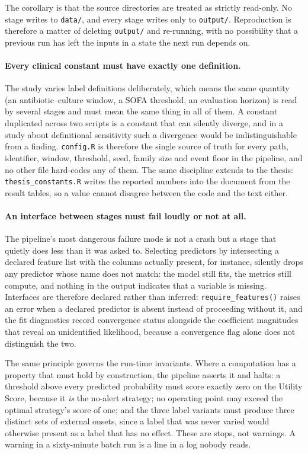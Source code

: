 The corollary is that the source directories are treated as strictly read-only.
No stage writes to \texttt{data/}, and every stage writes only to
\texttt{output/}. Reproduction is therefore a matter of deleting
\texttt{output/} and re-running, with no possibility that a previous run has
left the inputs in a state the next run depends on.

\paragraph{Every clinical constant must have exactly one definition.}
The study varies label definitions deliberately, which means the same quantity (an antibiotic--culture window, a SOFA threshold, an evaluation horizon)
is read by several stages and must mean the same thing in all of them. A
constant duplicated across two scripts is a constant that can silently diverge,
and in a study about definitional sensitivity such a divergence would be
indistinguishable from a finding. \texttt{config.R} is therefore the single
source of truth for every path, identifier, window, threshold, seed, family size
and event floor in the pipeline, and no other file hard-codes any of them. The
same discipline extends to the thesis: \texttt{thesis\_constants.R} writes the
reported numbers into the document from the result tables, so a value cannot
disagree between the code and the text either.

\paragraph{An interface between stages must fail loudly or not at all.}
The pipeline's most dangerous failure mode is not a crash but a stage that
quietly does less than it was asked to. Selecting predictors by intersecting a
declared feature list with the columns actually present, for instance, silently
drops any predictor whose name does not match: the model still fits, the
metrics still compute, and nothing in the output indicates that a variable is
missing. Interfaces are therefore declared rather than inferred:
\texttt{require\_features()} raises an error when a declared predictor is absent
instead of proceeding without it, and the fit diagnostics record convergence
status alongside the coefficient magnitudes that reveal an unidentified
likelihood, because a convergence flag alone does not distinguish the two.

The same principle governs the run-time invariants. Where a computation has a
property that must hold by construction, the pipeline asserts it and halts:
a threshold above every predicted probability must score exactly zero on the
Utility Score, because it \emph{is} the no-alert strategy; no operating point may
exceed the optimal strategy's score of one; and the three label variants must
produce three distinct sets of external onsets, since a label that was never
varied would otherwise present as a label that has no effect. These are stops,
not warnings. A warning in a sixty-minute batch run is a line in a log nobody
reads.

